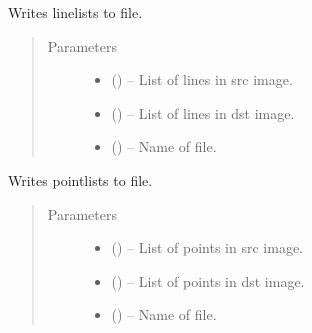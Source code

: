 \documentclass[letterpaper,10pt,english]{sphinxmanual}
\begin{document}

\begin{fulllineitems}
\label{\detokenize{image_io:image_io.write_lines}}
Writes linelists to file.
\begin{quote}\begin{description}
\item[{Parameters}] \leavevmode\begin{itemize}
\item {} 
 () -- List of lines in src image.

\item {} 
 () -- List of lines in dst image.

\item {} 
 () -- Name of file.

\end{itemize}

\end{description}\end{quote}

\end{fulllineitems}


\begin{fulllineitems}
\label{\detokenize{image_io:image_io.write_points}}
Writes pointlists to file.
\begin{quote}\begin{description}
\item[{Parameters}] \leavevmode\begin{itemize}
\item {} 
 () -- List of points in src image.

\item {} 
 () -- List of points in dst image.

\item {} 
 () -- Name of file.

\end{itemize}

\end{description}\end{quote}

\end{fulllineitems}
\end{document}
